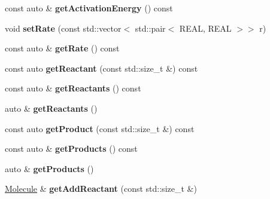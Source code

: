 \begin{DoxyCompactItemize}
\item 
\mbox{\label{classReactionBase_a6d4674768a54a2c0e14fbe1728d000e8}} 
const auto \& {\bfseries get\+Activation\+Energy} () const
\item 
\mbox{\label{classReactionBase_aef07f8ea4b7b1e2a5c845b975a483068}} 
void {\bfseries set\+Rate} (const std\+::vector$<$ std\+::pair$<$ R\+E\+AL, R\+E\+AL $>$$>$ r)
\item 
\mbox{\label{classReactionBase_add55a600cdce958694340acf21d53f7c}} 
const auto \& {\bfseries get\+Rate} () const
\item 
\mbox{\label{classReactionBase_a95c27a29dc68337fd5952c7041e841ae}} 
const auto {\bfseries get\+Reactant} (const std\+::size\+\_\+t \&) const
\item 
\mbox{\label{classReactionBase_acd2fb67953b08595d2b1a47178fccf17}} 
const auto \& {\bfseries get\+Reactants} () const
\item 
\mbox{\label{classReactionBase_ac3f3c586862e81cede4de3cf578f66ba}} 
auto \& {\bfseries get\+Reactants} ()
\item 
\mbox{\label{classReactionBase_a14a6362a090dbe19863c96168c5d54d6}} 
const auto {\bfseries get\+Product} (const std\+::size\+\_\+t \&) const
\item 
\mbox{\label{classReactionBase_adfa2078cd128b851e7c01857f5c201ea}} 
const auto \& {\bfseries get\+Products} () const
\item 
\mbox{\label{classReactionBase_a401b658122ff826b798815dec0ee72d4}} 
auto \& {\bfseries get\+Products} ()
\item 
\mbox{\label{classReactionBase_a90290e7188cafcc8004530ca121c4eff}} 
\mbox{\hyperlink{classMolecule}{Molecule}} \& {\bfseries get\+Add\+Reactant} (const std\+::size\+\_\+t \&)
\item 
\mbox{\label{classReactionBase_a54a123c645a586ffee09202f0d8bae87}} 
$$
\end{DoxyCompactItemize}
